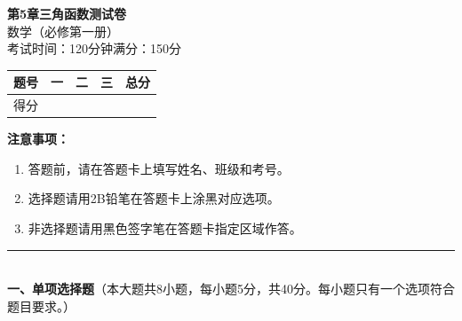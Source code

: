 \documentclass[12pt, a4paper]{ctexart}
\begin{document}
\begin{center}
{\Large\bfseries 第5章\quad 三角函数\quad 测试卷}\\[6pt]
{\normalsize 数学（必修第一册）}\\[4pt]
{\small 考试时间：120分钟\quad 满分：150分}
\end{center}

\vspace{2pt}
\begin{center}
\begin{tabular}{|c|c|c|c|c|}
\hline
题号 & 一 & 二 & 三 & 总分 \\ \hline
得分 & & & & \\ \hline
\end{tabular}
\end{center}
\vspace{4pt}

\noindent\textbf{注意事项：}
\begin{enumerate}[leftmargin=2em]
  \item 答题前，请在答题卡上填写姓名、班级和考号。
  \item 选择题请用2B铅笔在答题卡上涂黑对应选项。
  \item 非选择题请用黑色签字笔在答题卡指定区域作答。
\end{enumerate}

\vspace{6pt}

\noindent\rule{\textwidth}{0.4pt}\\[2pt]
{\large\bfseries 一、单项选择题}（本大题共8小题，每小题5分，共40分。每小题只有一个选项符合题目要求。）

\vspace{6pt}
\end{document}
